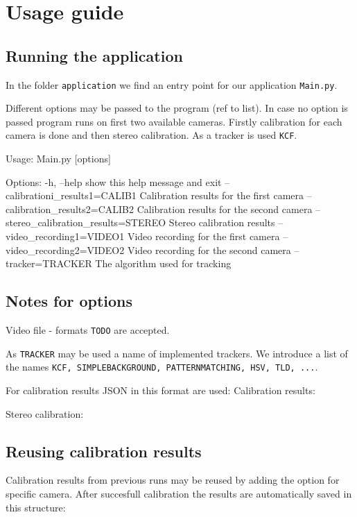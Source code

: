 \section{Usage guide}

\subsection{Running the application}
In the folder \verb+application+ we find an entry point for our application
\verb+Main.py+.

Different options may be passed to the program (ref to list). In case no option
is passed program runs on first two available cameras. Firstly calibration for
each camera is done and then stereo calibration. As a tracker is used \verb+KCF+.

\begin{code}
Usage: Main.py [options]

Options:
  -h, --help            show this help message and exit
  --calibrationi\_results1=CALIB1
                        Calibration results for the first camera
  --calibration\_results2=CALIB2
                        Calibration results for the second camera
  --stereo\_calibration\_results=STEREO
                        Stereo calibration results
  --video\_recording1=VIDEO1
                        Video recording for the first camera
  --video\_recording2=VIDEO2
                        Video recording for the second camera
  --tracker=TRACKER     The algorithm used for tracking
\end{code}

\subsection{Notes for options}
Video file
- formats \verb+TODO+ are accepted.

As \verb+TRACKER+ may be used a name of implemented trackers. We introduce a list of the names \verb+KCF, SIMPLEBACKGROUND, PATTERNMATCHING, HSV, TLD, ...+.

For calibration results JSON in this format are used:
Calibration results:


Stereo calibration:
\begin{code}

\end{code}
\subsection{Reusing calibration results}
Calibration results from previous runs may be reused by adding the option for specific camera. After succesfull calibration the results are automatically saved in this structure:

